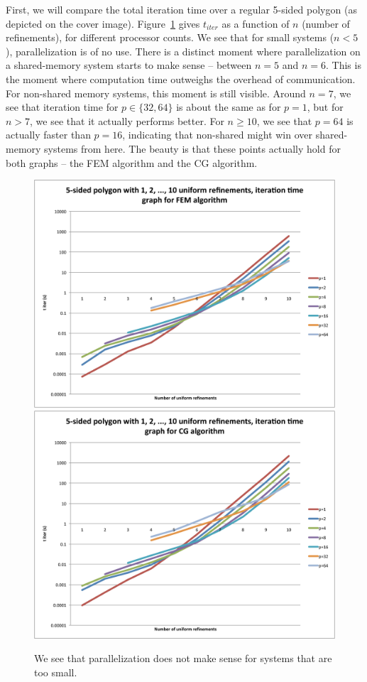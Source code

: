 \documentclass[11pt]{amsart}
\theoremstyle{definition}
\begin{document}
First, we will compare the total iteration time over a regular 5-sided polygon (as depicted on the cover image). Figure~\ref{fig:times} gives $t_{iter}$ as a function of $n$ (number of refinements), for different processor counts. We see that for small systems ($n < 5$), parallelization is of no use. There is a distinct moment where parallelization on a shared-memory system starts to make sense -- between $n=5$ and $n=6$. This is the moment where computation time outweighs the overhead of communication. For non-shared memory systems, this moment is still visible. Around $n=7$, we see that iteration time for $p \in \{32, 64\}$ is about the same as for $p=1$, but for $n>7$, we see that it actually performs better. For $n\geq 10$, we see that $p=64$ is actually faster than $p=16$, indicating that non-shared might win over shared-memory systems from here. The beauty is that these points actually hold for both graphs -- the FEM algorithm and the CG algorithm.
\begin{figure}
  \includegraphics[width=0.8\linewidth]{times_fem.pdf}
  \includegraphics[width=0.8\linewidth]{times_cg.pdf}
  \caption{We see that parallelization does not make sense for systems that are too small.}
  \label{fig:times}
\end{figure}
\end{document}
